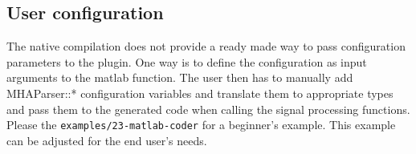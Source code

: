 \documentclass[11pt,a4paper,twoside]{article}
\newcommand{\+}{\discretionary{\mbox{\scriptsize$\hookleftarrow$}}{}{}}
\begin{document}
\subsection{User configuration}
The native compilation does not provide a ready made way to pass configuration parameters to the plugin.
One way is to define the configuration as input arguments to the matlab function.
The user then has to manually add MHAParser::* configuration variables and translate them to appropriate types and
pass them to the generated code when calling the signal processing functions.
Please the \texttt{examples/23-matlab-coder} for a beginner's example. This
example can be adjusted for the end user's needs.
\end{document}
